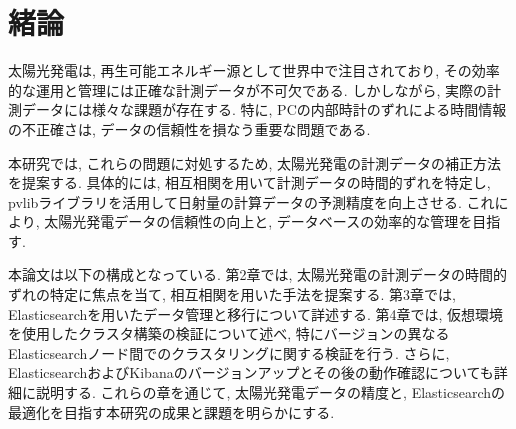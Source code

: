 \chapter{緒論}
\label{chap:first}

太陽光発電は, 再生可能エネルギー源として世界中で注目されており, その効率的な運用と管理には正確な計測データが不可欠である. しかしながら, 実際の計測データには様々な課題が存在する. 特に, PCの内部時計のずれによる時間情報の不正確さは, データの信頼性を損なう重要な問題である.

本研究では, これらの問題に対処するため, 太陽光発電の計測データの補正方法を提案する. 具体的には, 相互相関を用いて計測データの時間的ずれを特定し, pvlibライブラリを活用して日射量の計算データの予測精度を向上させる. これにより, 太陽光発電データの信頼性の向上と, データベースの効率的な管理を目指す.

本論文は以下の構成となっている. 第2章では, 太陽光発電の計測データの時間的ずれの特定に焦点を当て, 相互相関を用いた手法を提案する. 第3章では, Elasticsearchを用いたデータ管理と移行について詳述する. 第4章では, 仮想環境を使用したクラスタ構築の検証について述べ, 特にバージョンの異なるElasticsearchノード間でのクラスタリングに関する検証を行う. さらに, ElasticsearchおよびKibanaのバージョンアップとその後の動作確認についても詳細に説明する. これらの章を通じて, 太陽光発電データの精度と, Elasticsearchの最適化を目指す本研究の成果と課題を明らかにする.